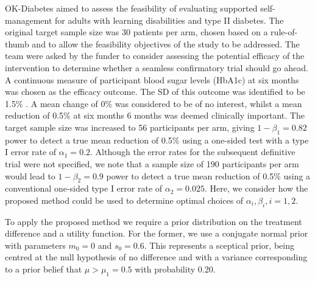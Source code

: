 \documentclass[sagev, Crown]{sagej}
\begin{document}
OK-Diabetes \cite{Walwyn2015} aimed to assess the feasibility of evaluating supported self-management for adults with learning disabilities and type II diabetes. The original target sample size was 30 patients per arm, chosen based on a rule-of-thumb \cite{Lancaster2004} and to allow the feasibility objectives of the study to be addressed. The team were asked by the funder to consider assessing the potential efficacy of the intervention to determine whether a seamless confirmatory trial should go ahead. A continuous measure of participant blood sugar levels (HbA1c) at six months was chosen as the efficacy outcome. The SD of this outcome was identified to be 1.5\% \cite{OKD2013}. A mean change of 0\% was considered to be of no interest, whilst a mean reduction of 0.5\% at six months 6 months was deemed clinically important. The target sample size was increased to 56 participants per arm, giving $1-\beta_1 = 0.82$ power to detect a true mean reduction of 0.5\% using a one-sided test with a type I error rate of $\alpha_1 = 0.2$. Although the error rates for the subsequent definitive trial were not specified, we note that a sample size of 190 participants per arm would lead to $1-\beta_2 = 0.9$ power to detect a true mean reduction of 0.5\% using a conventional one-sided type I error rate of $\alpha_2 = 0.025$. Here, we consider how the proposed method could be used to determine optimal choices of $\alpha_i, \beta_i, i=1,2$.

To apply the proposed method we require a prior distribution on the treatment difference and a utility function. For the former, we use a conjugate normal prior with parameters $m_0 = 0$ and $s_0 = 0.6$. This represents a sceptical prior, being centred at the null hypothesis of no difference and with a variance corresponding to a prior belief that $\mu > \mu_1 = 0.5$ with probability 0.20.
\end{document}
